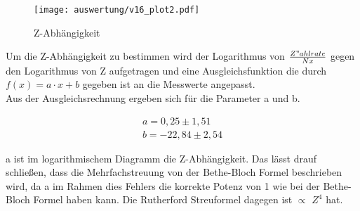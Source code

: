 \begin{figure}[H]
	\centering
	\texttt{[image: auswertung/v16\_plot2.pdf]}
	\caption{Z-Abhängigkeit}
	\label{img:grafik-dummy}
\end{figure}

Um die Z-Abhängigkeit zu bestimmen wird der Logarithmus von $\frac{Z"ahlrate}{Nx}$ gegen den Logarithmus von Z aufgetragen und eine Ausgleichsfunktion die durch $f(x)=a\cdot x+b$ gegeben ist an die Messwerte angepasst. \\
Aus der Ausgleichsrechnung ergeben sich für die Parameter a und b.

\begin{align*}
a= 0,25 \pm 1,51 
\\
b= -22,84 \pm 2,54 
\end{align*}

a ist im logarithmischem Diagramm die Z-Abhängigkeit. Das lässt drauf schließen, dass die Mehrfachstreuung von der Bethe-Bloch Formel beschrieben wird, da a im Rahmen dies Fehlers die korrekte Potenz von 1 wie bei der Bethe-Bloch Formel haben kann. Die Rutherford Streuformel dagegen ist $\propto$ $Z^4$ hat. 



